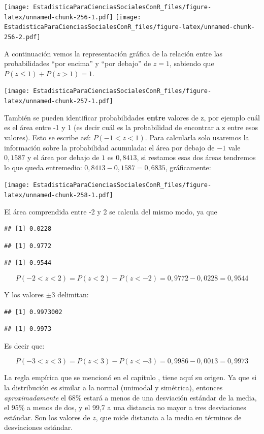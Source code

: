 \documentclass[]{book}
\begin{document}
\texttt{[image: EstadisticaParaCienciasSocialesConR\_files/figure-latex/unnamed-chunk-256-1.pdf]} \texttt{[image: EstadisticaParaCienciasSocialesConR\_files/figure-latex/unnamed-chunk-256-2.pdf]}

A continuación vemos la representación gráfica de la relación entre las
probabilidades ``por encima'' y ``por debajo'' de \(z=1\), sabiendo que \(P(z\leq1)+P(z>1)=1\).

\texttt{[image: EstadisticaParaCienciasSocialesConR\_files/figure-latex/unnamed-chunk-257-1.pdf]}

También se pueden identificar probabilidades \textbf{entre} valores de z, por
ejemplo cuál es el área entre -1 y 1 (es decir cuál es la probabilidad
de encontrar a z entre esos valores). Esto se escribe así:
\(P(-1<z<1)\). Para calcularla solo usaremos la información sobre la
probabilidad acumulada: el área por debajo de \(-1\) vale \(0,1587\) y el área por debajo de \(1\) es \(0,8413\), si restamos esas dos áreas tendremos lo que queda entremedio: \(0,8413 - 0,1587 = 0,6835\), gráficamente:

\texttt{[image: EstadisticaParaCienciasSocialesConR\_files/figure-latex/unnamed-chunk-258-1.pdf]}

El área comprendida entre -2 y 2 se calcula del mismo modo, ya que

\begin{verbatim}
## [1] 0.0228
\end{verbatim}

\begin{verbatim}
## [1] 0.9772
\end{verbatim}

\begin{verbatim}
## [1] 0.9544
\end{verbatim}

\[P(- 2 < z < 2) = P(z < 2) - P(z < - 2) = 0,9772 - 0,0228 = 0,9544\]

Y los valores \(\pm3\) delimitan:

\begin{verbatim}
## [1] 0.9973002
\end{verbatim}

\begin{verbatim}
## [1] 0.9973
\end{verbatim}

Es decir que:

\[P(- 3 < z < 3) = P(z < 3) - P(z < - 3) = 0,9986 - 0,0013 = 0,9973\]

La regla empírica que se mencionó en el capítulo , tiene aquí su origen. Ya que si la distribución es similar a la normal (unimodal y simétrica), entonces \emph{aproximadamente} el 68\% estará a menos de una desviación estándar de la media, el 95\% a menos de dos, y el 99,7 a una distancia no mayor a tres desviaciones estándar. Son los valores de \(z\), que mide distancia a la media en términos de desviaciones estándar.
\end{document}
